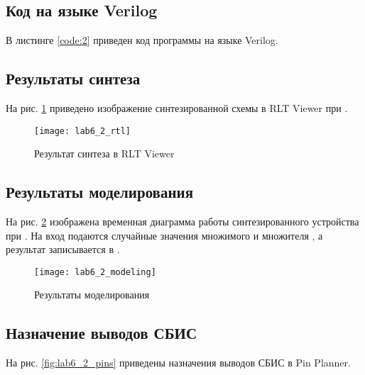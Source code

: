 \newpage

\subsection{Код на языке Verilog}

В листинге \ref{code:2} приведен код программы на языке Verilog.


\vspace{-0.5cm}

\newpage

\subsection{Результаты синтеза}

На рис. \ref{fig:lab6_2_rtl} приведено изображение синтезированной схемы в RLT Viewer при .

\begin{figure}[H]
\begin{center}
	\texttt{[image: lab6\_2\_rtl]}
	\caption{Результат синтеза в RLT Viewer}
	\label{fig:lab6_2_rtl}
\end{center}
\end{figure}

\subsection{Результаты моделирования}
\label{sec:lab6_2_modeling}

На рис. \ref{fig:lab6_2_modeling} изображена временная диаграмма работы синтезированного устройства при . На вход подаются случайные значения множимого  и множителя , а результат записывается в .
\begin{figure}[H]
\begin{center}
	\texttt{[image: lab6\_2\_modeling]}
	\caption{Результаты моделирования}
	\label{fig:lab6_2_modeling}
\end{center}
\end{figure}

\newpage

\subsection{Назначение выводов СБИС}

На рис. \ref{fig:lab6_2_pins} приведены назначения выводов СБИС в Pin Planner.

